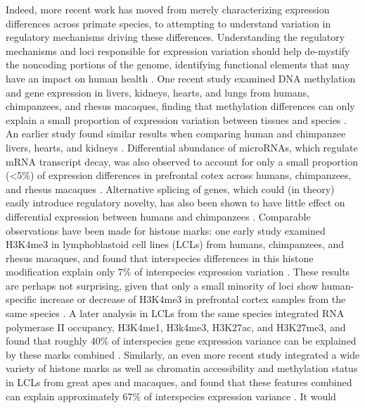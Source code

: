 {Indeed, more recent work has moved from merely characterizing expression differences across primate species, to attempting to understand variation in regulatory mechanisms driving these differences. Understanding the regulatory mechanisms and loci responsible for expression variation should help de-mystify the noncoding portions of the genome, identifying functional elements that may have an impact on human health \cite{Cooper and Shendure 2011 (Needles in stacks of needles: finding disease-causal variants in a wealth of genomic data)}. One recent study examined DNA methylation and gene expression in livers, kidneys, hearts, and lungs from humans, chimpanzees, and rhesus macaques, finding that methylation differences can only explain a small proportion of expression variation between tissues and species \cite{Blake et al 2020 (A comparison of gene expression and DNA methylation...)}. An earlier study found similar results when comparing human and chimpanzee livers, hearts, and kidneys \cite{Pai et al 2011 (A Genome-Wide study of DNA methylation...)}. Differential abundance of microRNAs, which regulate mRNA transcript decay, was also observed to account for only a small proportion (<5\%) of expression differences in prefrontal cotex across humans, chimpanzees, and rhesus macaques \cite{Hu et al. 2011 (MicroRNA expression and regulation in human...), Somel et al. 2011 (MicroRNA-driven developmental remodeling in the brain...)}. Alternative splicing of genes, which could (in theory) easily introduce regulatory novelty, has also been shown to have little effect on differential expression between humans and chimpanzees \cite{Calarco et al. 2007 (Global analysis of alternative splicing differences between humans and chimpanzees)}. Comparable observations have been made for histone marks: one early study examined H3K4me3 in lymphoblastoid cell lines (LCLs) from humans, chimpanzees, and rhesus macaques, and found that interspecies differences in this histone modification explain only 7\% of interspecies expression variation \cite{Cain et al 2011 (Gene expression differences among primates are associated with changes in a histone epigenetic modification)}. These results are perhaps not surprising, given that only a small minority of loci show human-specific increase or decrease of H3K4me3 in prefrontal cortex samples from the same species \cite{Shulha et al 2012 (Human-specific histone methylation signatures at transcription start sites in prefrontal neurons)}. A later analysis in LCLs from the same species integrated RNA polymerase II occupancy, H3K4me1, H3k4me3, H3K27ac, and H3K27me3, and found that roughly 40\% of interspecies gene expression variance can be explained by these marks combined \cite{Zhou et al. 2014 (Epigenetic modifications are associated with inter-species gene expression variation in primates)}. Similarly, an even more recent study integrated a wide variety of histone marks as well as chromatin accessibility and methylation status in LCLs from great apes and macaques, and found that these features combined can explain approximately 67\% of interspecies expression variance \cite{Garcia-Perez et al 2020 (Biorxiv, Epigenomic profiling of primate LCLs reveals the coordinated evolution of gene expression and epigenetic signals in regulatory architectures)}. It would }
